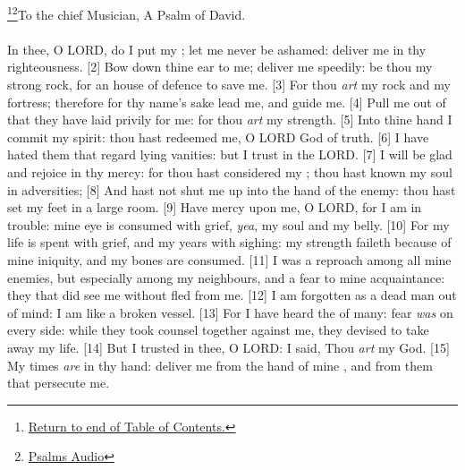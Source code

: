 \footnote{\textcolor[cmyk]{0.99998,1,0,0}{\hyperlink{TOC}{Return to end of Table of Contents.}}}\footnote{\href{https://www.audioverse.org/english/audiobibles/books/ENGKJV/O/Ps/1}{\textcolor[cmyk]{0.99998,1,0,0}{Psalms Audio}}}\textcolor[cmyk]{0.99998,1,0,0}{To the chief Musician, A Psalm of David.}\\
\\
\textcolor[cmyk]{0.99998,1,0,0}{In thee, O LORD, do I put my ; let me never be ashamed: deliver me in thy righteousness.}
[2] \textcolor[cmyk]{0.99998,1,0,0}{Bow down thine ear to me; deliver me speedily: be thou my strong rock, for an house of defence to save me.}
[3] \textcolor[cmyk]{0.99998,1,0,0}{For thou \emph{art} my rock and my fortress; therefore for thy name's sake lead me, and guide me.}
[4] \textcolor[cmyk]{0.99998,1,0,0}{Pull me out of  that they have laid privily for me: for thou \emph{art} my strength.}
[5] \textcolor[cmyk]{0.99998,1,0,0}{Into thine hand I commit my spirit: thou hast redeemed me, O LORD God of truth.}
[6] \textcolor[cmyk]{0.99998,1,0,0}{I have hated them that regard lying vanities: but I trust in the LORD.}
[7] \textcolor[cmyk]{0.99998,1,0,0}{I will be glad and rejoice in thy mercy: for thou hast considered my ; thou hast known my soul in adversities;}
[8] \textcolor[cmyk]{0.99998,1,0,0}{And hast not shut me up into the hand of the enemy: thou hast set my feet in a large room.}
[9] \textcolor[cmyk]{0.99998,1,0,0}{Have mercy upon me, O LORD, for I am in trouble: mine eye is consumed with grief, \emph{yea}, my soul and my belly.}
[10] \textcolor[cmyk]{0.99998,1,0,0}{For my life is spent with grief, and my years with sighing: my strength faileth because of mine iniquity, and my bones are consumed.}
[11] \textcolor[cmyk]{0.99998,1,0,0}{I was a reproach among all mine enemies, but especially among my neighbours, and a fear to mine acquaintance: they that did see me without fled from me.}
[12] \textcolor[cmyk]{0.99998,1,0,0}{I am forgotten as a dead man out of mind: I am like a broken vessel.}
[13] \textcolor[cmyk]{0.99998,1,0,0}{For I have heard the  of many: fear \emph{was} on every side: while they took counsel together against me, they devised to take away my life.}
[14] \textcolor[cmyk]{0.99998,1,0,0}{But I trusted in thee, O LORD: I said, Thou \emph{art} my God.}
[15] \textcolor[cmyk]{0.99998,1,0,0}{My times \emph{are} in thy hand: deliver me from the hand of mine , and from them that persecute me.}
